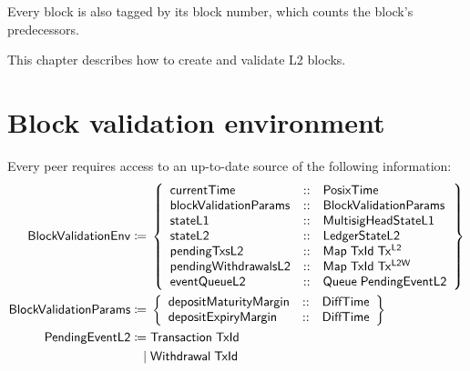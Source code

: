 \documentclass[../hydrozoa.tex]{subfiles}
\begin{document}
Every block is also tagged by its block number, which counts the block's predecessors.

This chapter describes how to create and validate L2 blocks.

\section{Block validation environment}%
\label{h:l2-block-validation-environment}%

Every peer requires access to an up-to-date source of the following information:
\begin{equation*}
\begin{split}
  \mathsf{BlockValidationEnv} \coloneq&\; \left\{
    \begin{array}{lll}
      \mathsf{currentTime} &::& \mathsf{PosixTime} \\
      \mathsf{blockValidationParams} &::& \mathsf{BlockValidationParams} \\
      \mathsf{stateL1} &::& \mathsf{MultisigHeadStateL1} \\
      \mathsf{stateL2} &::& \mathsf{LedgerStateL2} \\
      \mathsf{pendingTxsL2} &::& \mathsf{Map} \; \mathsf{TxId} \; \mathsf{Tx^{L2}} \\
      \mathsf{pendingWithdrawalsL2} &::& \mathsf{Map} \; \mathsf{TxId} \; \mathsf{Tx^{L2W}} \\
      \mathsf{eventQueueL2} &::& \mathsf{Queue} \; \mathsf{PendingEventL2}
    \end{array}\right\} \\
  \mathsf{BlockValidationParams} \coloneq&\; \left\{
    \begin{array}{lll}
      \mathsf{depositMaturityMargin} &::& \mathsf{DiffTime} \\
      \mathsf{depositExpiryMargin} &::& \mathsf{DiffTime}
    \end{array}\right\} \\
  \mathsf{PendingEventL2} \coloneq&\;
    \mathsf{Transaction} \; \mathsf{TxId} \\\mid&\;
    \mathsf{Withdrawal} \; \mathsf{TxId}
\end{split}
\end{equation*}
\end{document}
